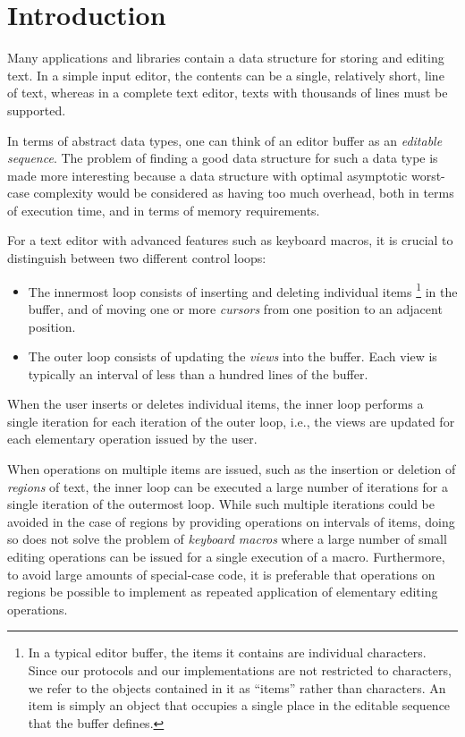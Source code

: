 \section{Introduction}
\label{sec-introduction}

Many applications and libraries contain a data structure for storing
and editing text.  In a simple input editor, the contents can be a
single, relatively short, line of text, whereas in a complete text
editor, texts with thousands of lines must be supported.

In terms of abstract data types, one can think of an editor buffer as
an \emph{editable sequence}.  The problem of finding a good data
structure for such a data type is made more interesting because a data
structure with optimal asymptotic worst-case complexity would be
considered as having too much overhead, both in terms of execution
time, and in terms of memory requirements.

For a text editor with advanced features such as keyboard macros, it
is crucial to distinguish between two different control loops:

\begin{itemize}
\item The innermost loop consists of inserting and deleting individual
  items%
\footnote{In a typical editor buffer, the items it contains are
  individual characters.  Since our protocols and our implementations
  are not restricted to characters, we refer to the objects contained
  in it as ``items'' rather than characters.  An item is simply an
  object that occupies a single place in the editable sequence that
  the buffer defines.}
in the buffer, and of moving one or
  more \emph{cursors} from one position to an adjacent position.
\item The outer loop consists of updating the \emph{views} into the
  buffer.  Each view is typically an interval of less than a
  hundred lines of the buffer.
\end{itemize}

When the user inserts or deletes individual items, the inner loop
performs a single iteration for each iteration of the outer loop,
i.e., the views are updated for each elementary operation issued by
the user.

When operations on multiple items are issued, such as the insertion or
deletion of \emph{regions} of text, the inner loop can be executed a
large number of iterations for a single iteration of the outermost
loop.  While such multiple iterations could be avoided in the case of
regions by providing operations on intervals of items, doing so does
not solve the problem of \emph{keyboard macros} where a large number
of small editing operations can be issued for a single execution of a
macro.  Furthermore, to avoid large amounts of special-case code, it
is preferable that operations on regions be possible to implement as
repeated application of elementary editing operations.

